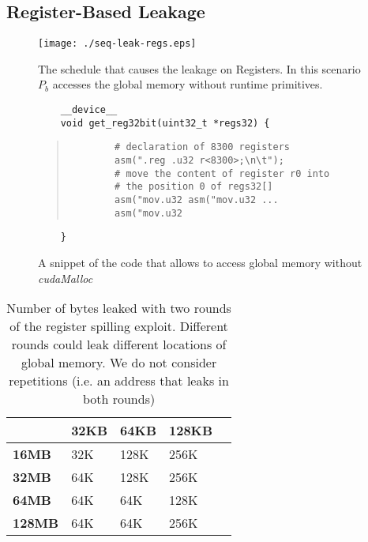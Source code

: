 \documentclass[11pt,onecolumn,letterpaper]{IEEEtran}
\begin{document}
\subsection{Register-Based Leakage}
\label{sub:regmem_attack}

\begin{figure}[t]
\begin{center}
	\texttt{[image: ./seq-leak-regs.eps]}
	\caption{The schedule that causes the leakage on Registers.
			In this scenario $P_b$ accesses the global memory without runtime primitives.}
	\label{fig:regs_attack}
\end{center}
\end{figure}
\begin{figure}
{
	\fontsize{8pt}{10pt}\selectfont
	\begin{verbatim}
	__device__
	void get_reg32bit(uint32_t *regs32) {
	\end{verbatim}
	\begin{quote}
	
		\begin{verbatim}
		# declaration of 8300 registers
		asm(".reg .u32 r<8300>;\n\t");
		# move the content of register r0 into
		# the position 0 of regs32[]
		asm("mov.u32 asm("mov.u32 ...
		asm("mov.u32 \end{verbatim}
	
	\end{quote}
	\begin{verbatim}
	}
	\end{verbatim}

}
\label{fig:snip-reg-attack}
\caption{A snippet of the code that allows to access global memory without \emph{cudaMalloc}}
\end{figure}


\begin{center}
\begin{table}
	\centering
	\caption{Number of bytes leaked with two rounds of the register spilling exploit. Different
			 rounds could leak different locations of global memory. We do not consider repetitions (i.e.
			 an address that leaks in both rounds)}
\begin{tabular}{| l | l | l | l | l |}
	\hline
		& \textbf{32KB} & \textbf{64KB} & \textbf{128KB}\\
		 \hline
		 \textbf{16MB} &  32K & 128K & 256K \\
		 \hline
		 \textbf{32MB} &  64K & 128K & 256K \\
		 \hline
		 \textbf{64MB} &  64K & 64K  & 128K \\
		 \hline
		 \textbf{128MB}&  64K & 64K  & 256K \\
	\hline 	 	 	
	\end{tabular}
	\smallskip
	\smallskip
\label{tab:reg-attack-summary}
\end{table}
\end{center}
\end{document}
